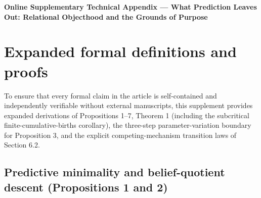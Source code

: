 \documentclass[11pt,letterpaper]{article}
\begin{document}
\thispagestyle{plain}
\begin{center}
{\fontsize{17.5}{22}\selectfont\bfseries Online Supplementary Technical
Appendix --- What Prediction Leaves Out: Relational Objecthood and the
Grounds of Purpose\par}
\end{center}
\vspace{4pt}
\begin{abstract}
\noindent Expanded mathematical derivations, Blackwell non-simulability
and parameter-identifiability witnesses, subcritical finite-birth
bounds, competing-mechanism transition equations, and rational witness
verifications supporting Propositions 1--7, Theorem 1, and Section 6
(anonymized for double-blind review).
\end{abstract}
\vspace{8pt}

\appendix

\section{Expanded formal definitions and
proofs}\label{expanded-formal-definitions-and-proofs}

To ensure that every formal claim in the article is self-contained and
independently verifiable without external manuscripts, this supplement
provides expanded derivations of Propositions 1--7, Theorem 1 (including
the subcritical finite-cumulative-births corollary), the three-step
parameter-variation boundary for Proposition 3, and the explicit
competing-mechanism transition laws of Section 6.2.

\subsection{Predictive minimality and belief-quotient descent
(Propositions 1 and
2)}\label{predictive-minimality-and-belief-quotient-descent-propositions-1-and-2}
\end{document}
